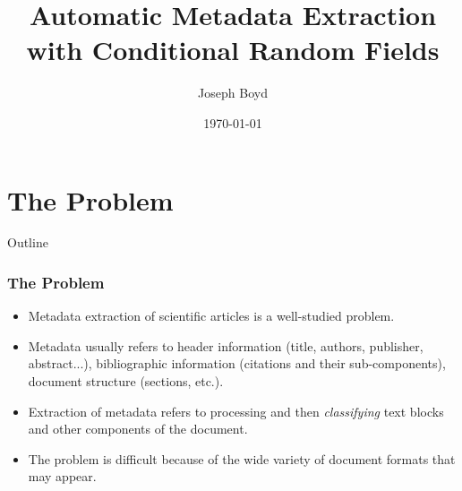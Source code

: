 \documentclass{beamer}
\title[Automatic Metadata Extraction]{Automatic Metadata Extraction with Conditional Random Fields} %
\author{Joseph Boyd} %
\institute[EPFL] %
{
\'Ecole Polytechnique F\'ed\'erale de Lausanne \\ %
\medskip
\textit{joseph.boyd@epfl.ch} %
}
\date{\today} %
\begin{document}
\begin{frame}
\titlepage %
\end{frame}


\section{The Problem}
\begin{frame}[noframenumbering]{Outline}
\end{frame}


\begin{frame}
\frametitle{The Problem}
\begin{itemize}
\item Metadata extraction of scientific articles is a well-studied problem.
\item Metadata usually refers to header information (title, authors, publisher, abstract...), bibliographic information (citations and their sub-components), document structure (sections, etc.).
\item Extraction of metadata refers to processing and then \emph{classifying} text blocks and other components of the document.
\item The problem is difficult because of the wide variety of document formats that may appear.
\end{itemize}
\end{frame}
\end{document}
